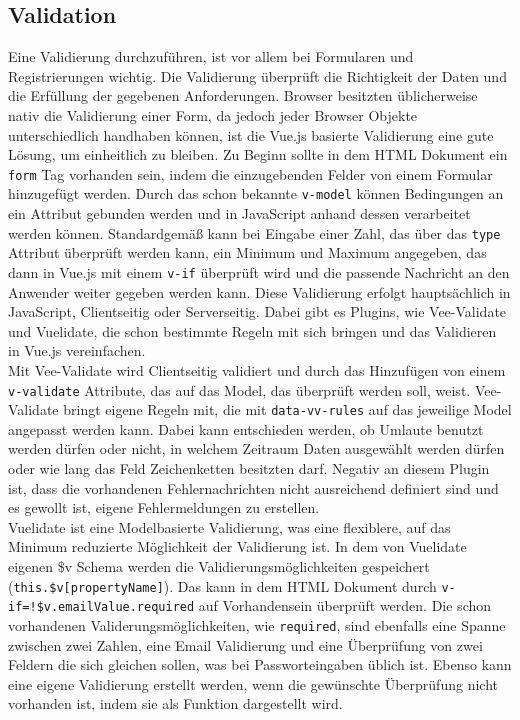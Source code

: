 \subsection*{Validation}
Eine Validierung durchzuf\"uhren, ist vor allem bei Formularen und Registrierungen wichtig. Die Validierung \"uberpr\"uft die Richtigkeit der Daten und die Erf\"ullung der gegebenen Anforderungen. Browser besitzten \"ublicherweise nativ die Validierung einer Form, da jedoch jeder Browser Objekte unterschiedlich handhaben k\"onnen, ist die Vue.js basierte Validierung eine gute L\"osung, um einheitlich zu bleiben. Zu Beginn sollte in dem \ac{HTML} Dokument ein \texttt{form} Tag vorhanden sein, indem die einzugebenden Felder von einem Formular hinzugef\"ugt werden. Durch das schon bekannte \texttt{v-model} k\"onnen Bedingungen an ein Attribut gebunden werden und in JavaScript anhand dessen verarbeitet werden k\"onnen.
Standardgem\"a\ss{} kann bei Eingabe einer Zahl, das \"uber das \texttt{type} Attribut \"uberpr\"uft werden kann, ein Minimum und Maximum angegeben, das dann in Vue.js mit einem \texttt{v-if} \"uberpr\"uft wird und die passende Nachricht an den Anwender weiter gegeben werden kann. Diese Validierung erfolgt haupts\"achlich in JavaScript, Clientseitig oder Serverseitig. Dabei gibt es Plugins, wie Vee-Validate und Vuelidate, die schon bestimmte Regeln mit sich bringen und das Validieren in Vue.js vereinfachen\cite{VueDokumentationValidierung2018}.\\
Mit Vee-Validate wird Clientseitig validiert und durch das Hinzuf\"ugen von einem \texttt{v-validate} Attribute, das auf das Model, das \"uberpr\"uft werden soll, weist. Vee-Validate bringt eigene Regeln mit, die mit \texttt{data-vv-rules} auf das jeweilige Model angepasst werden kann. Dabei kann entschieden werden, ob Umlaute benutzt werden d\"urfen oder nicht, in welchem Zeitraum Daten ausgew\"ahlt werden d\"urfen oder wie lang das Feld Zeichenketten besitzten darf. Negativ an diesem Plugin ist, dass die vorhandenen Fehlernachrichten nicht ausreichend definiert sind und es gewollt ist, eigene Fehlermeldungen zu erstellen\cite{BemenderferVeeValidate2017}.\\
Vuelidate ist eine Modelbasierte Validierung, was eine flexiblere, auf das Minimum  reduzierte M\"oglichkeit der Validierung ist. In dem von Vuelidate eigenen \$v Schema werden die Validierungsm\"oglichkeiten gespeichert (\texttt{this.\$v[propertyName]}). Das kann in dem \ac{HTML} Dokument durch \texttt{v-if=\grqq !\$v.emailValue.required\grqq} auf Vorhandensein \"uberpr\"uft werden. Die schon vorhandenen Validerungsm\"oglichkeiten, wie \texttt{required}, sind ebenfalls eine Spanne zwischen zwei Zahlen, eine Email Validierung und eine \"Uberpr\"ufung von zwei Feldern die sich gleichen sollen, was bei Passworteingaben \"ublich ist. Ebenso kann eine eigene Validierung erstellt werden, wenn die gew\"unschte \"Uberpr\"ufung nicht vorhanden ist, indem  sie als Funktion dargestellt wird\cite{BemenderferVuelidate2017}.

